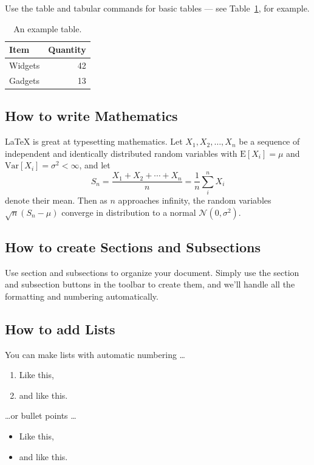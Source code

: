 \documentclass[a4paper]{article}
\begin{document}
Use the table and tabular commands for basic tables --- see Table~\ref{tab:widgets}, for example. 

\begin{table}
\centering
\begin{tabular}{l|r}
Item & Quantity \\\hline
Widgets & 42 \\
Gadgets & 13
\end{tabular}
\caption{\label{tab:widgets}An example table.}
\end{table}

\subsection{How to write Mathematics}

\LaTeX{} is great at typesetting mathematics. Let $X_1, X_2, \ldots, X_n$ be a sequence of independent and identically distributed random variables with $\text{E}[X_i] = \mu$ and $\text{Var}[X_i] = \sigma^2 < \infty$, and let
\[S_n = \frac{X_1 + X_2 + \cdots + X_n}{n}
      = \frac{1}{n}\sum_{i}^{n} X_i\]
denote their mean. Then as $n$ approaches infinity, the random variables $\sqrt{n}(S_n - \mu)$ converge in distribution to a normal $\mathcal{N}(0, \sigma^2)$.


\subsection{How to create Sections and Subsections}

Use section and subsections to organize your document. Simply use the section and subsection buttons in the toolbar to create them, and we'll handle all the formatting and numbering automatically.

\subsection{How to add Lists}

You can make lists with automatic numbering \dots

\begin{enumerate}
\item Like this,
\item and like this.
\end{enumerate}
\dots or bullet points \dots
\begin{itemize}
\item Like this,
\item and like this.
\end{itemize}
\end{document}
